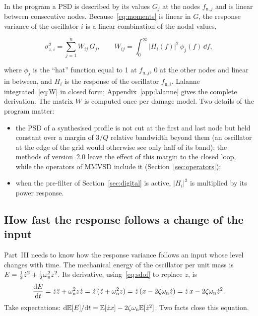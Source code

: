 In the program a PSD is described by its values $G_j$ at the nodes $f_{\mathrm{n},j}$ and is linear
between consecutive nodes. Because~\eqref{eq:moments} is linear in $G$, the response variance of the
oscillator $i$ is a linear combination of the nodal values,
\begin{result}
\begin{equation}\label{eq:W}
  \sigma_{z,i}^2 = \sum_{j=1}^n W_{ij}\,G_j ,
  \qquad W_{ij} = \int_0^\infty |H_i(f)|^2\,\phi_j(f)\,\dd f ,
\end{equation}
\end{result}
where $\phi_j$ is the ``hat'' function equal to 1 at $f_{\mathrm{n},j}$, 0 at the other nodes and
linear in between, and $H_i$ is the response of the oscillator $f_{\mathrm{n},i}$. Lalanne
integrated~\eqref{eq:W} in closed form; Appendix~\ref{app:lalanne} gives the complete derivation. The
matrix $W$ is computed once per damage model. Two details of the program matter:
\begin{itemize}[nosep]
\item the PSD of a synthesised profile is not cut at the first and last node but held constant over a
margin of $3/Q$ relative bandwidth beyond them (an oscillator at the edge of the grid would otherwise
see only half of its band); the methods of version~2.0 leave the effect of this margin to the closed
loop, while the operators of MMVSD include it (Section~\ref{sec:operators});
\item when the pre-filter of Section~\ref{sec:digital} is active, $|H_i|^2$ is multiplied by its power
response.
\end{itemize}

\subsection{How fast the response follows a change of the input}\label{sec:envelope}

Part~III needs to know how the response variance follows an input whose level changes with time.
The mechanical energy of the oscillator per unit mass is $E = \tfrac12\dot z^2 + \tfrac12\omega_{\mathrm{n}}^2z^2$.
Its derivative, using~\eqref{eq:sdof} to replace $\ddot z$, is
\begin{equation}
  \frac{\mathrm{d} E}{\mathrm{d} t} = \dot z\ddot z + \omega_{\mathrm{n}}^2 z\dot z = \dot z\,(\ddot z + \omega_{\mathrm{n}}^2 z)
  = \dot z\,(x - 2\zeta\omega_{\mathrm{n}}\dot z) = \dot z\,x - 2\zeta\omega_{\mathrm{n}}\dot z^2 .
\end{equation}
Take expectations: $\mathrm{d}\mathbb{E}[E]/\mathrm{d} t = \mathbb{E}[\dot z x] - 2\zeta\omega_{\mathrm{n}}\mathbb{E}[\dot z^2]$. Two facts close this
equation.


